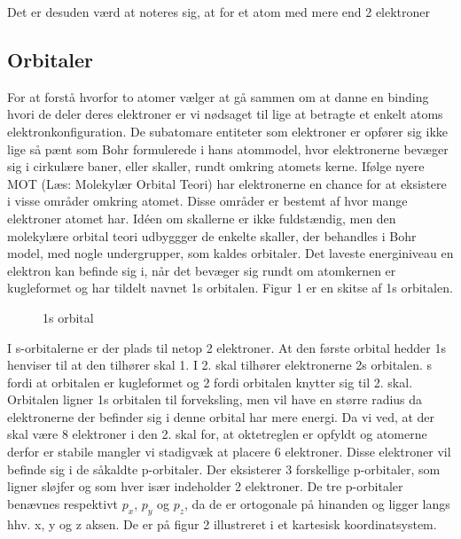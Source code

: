 \documentclass[12pt,a4paper]{article}
\theoremstyle{break}
\theoremstyle{nonumberplain}
\begin{document}
Det er desuden værd at noteres sig, at for et atom med mere end 2 elektroner


\subsection{Orbitaler}
For at forstå hvorfor to atomer vælger at gå sammen om at danne en binding hvori de deler deres elektroner er vi nødsaget til lige at betragte et enkelt atoms elektronkonfiguration. De subatomare entiteter som elektroner er opfører sig ikke lige så pænt som Bohr formulerede i hans atommodel, hvor elektronerne bevæger sig i cirkulære baner, eller skaller, rundt omkring atomets kerne. Ifølge nyere MOT (Læs: Molekylær Orbital Teori) har elektronerne en chance for at eksistere i visse områder omkring atomet. Disse områder er bestemt af hvor mange elektroner atomet har. Idéen om skallerne er ikke fuldstændig, men den molekylære orbital teori udbyggger de enkelte skaller, der behandles i Bohr model, med nogle undergrupper, som kaldes orbitaler. Det laveste energiniveau en elektron kan befinde sig i, når det bevæger sig rundt om atomkernen er kugleformet og har tildelt navnet 1s orbitalen. Figur 1 er en skitse af 1s orbitalen. 

\begin{figure}[ht!]
  \centering
  \caption{1s orbital} \end{figure}
  
  I s-orbitalerne er der plads til netop 2 elektroner. At den første orbital hedder 1s henviser til at den tilhører skal 1. I 2. skal tilhører elektronerne 2s orbitalen. s fordi at orbitalen er kugleformet og 2 fordi orbitalen knytter sig til 2. skal. Orbitalen ligner 1s orbitalen til forveksling, men vil have en større radius da elektronerne der befinder sig i denne orbital har mere energi. Da vi ved, at der skal være 8 elektroner i den 2. skal for, at oktetreglen er opfyldt og atomerne derfor er stabile mangler vi stadigvæk at placere 6 elektroner. Disse elektroner vil befinde sig i de såkaldte p-orbitaler. Der eksisterer 3 forskellige p-orbitaler, som ligner sløjfer og som hver især indeholder 2 elektroner. De tre p-orbitaler benævnes respektivt $p_x$, $p_y$ og $p_z$, da de er ortogonale på hinanden og ligger langs hhv. x, y og z aksen. De er på figur 2 illustreret i et kartesisk koordinatsystem.
  
\end{document}
